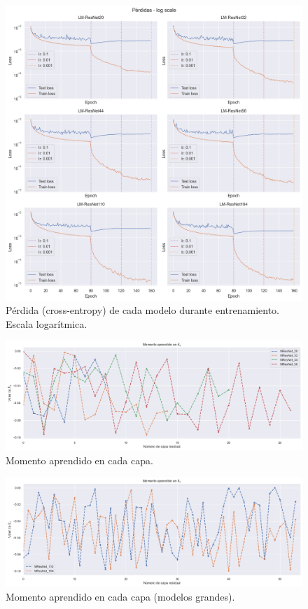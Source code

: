 \documentclass[titlepage,a4paper,oneside]{article}
\begin{document}
\begin{figure}[H]
\centering
\includegraphics[width=\textwidth]{images/loss_log.png}
\caption{Pérdida (cross-entropy) de cada modelo durante entrenamiento. Escala logarítmica.}
\label{train_loss_log}
\end{figure}

\begin{figure}[H]
\centering
\includegraphics[width=\textwidth]{images/momentum.png}
\caption{Momento aprendido en cada capa.}
\label{momentum}
\end{figure}

\begin{figure}[H]
\centering
\includegraphics[width=\textwidth]{images/momentum_large.png}
\caption{Momento aprendido en cada capa (modelos grandes).}
\label{momentum_large}
\end{figure}
\end{document}
